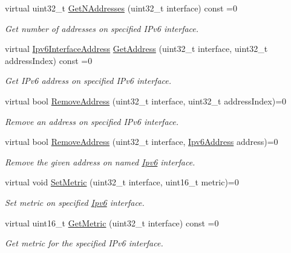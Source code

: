 \begin{DoxyCompactItemize}
virtual uint32\+\_\+t \hyperlink{classns3_1_1Ipv6_ac62012f48487d1e957a45f40a9386697}{Get\+N\+Addresses} (uint32\+\_\+t interface) const =0
\begin{DoxyCompactList}\small\item\em Get number of addresses on specified I\+Pv6 interface. \end{DoxyCompactList}\item 
virtual \hyperlink{classns3_1_1Ipv6InterfaceAddress}{Ipv6\+Interface\+Address} \hyperlink{classns3_1_1Ipv6_a00f1aa203323d9afa48d58af8af0e73b}{Get\+Address} (uint32\+\_\+t interface, uint32\+\_\+t address\+Index) const =0
\begin{DoxyCompactList}\small\item\em Get I\+Pv6 address on specified I\+Pv6 interface. \end{DoxyCompactList}\item 
virtual bool \hyperlink{classns3_1_1Ipv6_ad1e1c4d33ad96a76683ce8cea9d01780}{Remove\+Address} (uint32\+\_\+t interface, uint32\+\_\+t address\+Index)=0
\begin{DoxyCompactList}\small\item\em Remove an address on specified I\+Pv6 interface. \end{DoxyCompactList}\item 
virtual bool \hyperlink{classns3_1_1Ipv6_a29f451acbf047880073add4d0bd40550}{Remove\+Address} (uint32\+\_\+t interface, \hyperlink{classns3_1_1Ipv6Address}{Ipv6\+Address} address)=0
\begin{DoxyCompactList}\small\item\em Remove the given address on named \hyperlink{classns3_1_1Ipv6}{Ipv6} interface. \end{DoxyCompactList}\item 
virtual void \hyperlink{classns3_1_1Ipv6_ab8dfd51c931ebc11c107bff673bae827}{Set\+Metric} (uint32\+\_\+t interface, uint16\+\_\+t metric)=0
\begin{DoxyCompactList}\small\item\em Set metric on specified \hyperlink{classns3_1_1Ipv6}{Ipv6} interface. \end{DoxyCompactList}\item 
virtual uint16\+\_\+t \hyperlink{classns3_1_1Ipv6_a6bae4637f2a7f1e566a53c3270b891d4}{Get\+Metric} (uint32\+\_\+t interface) const =0
\begin{DoxyCompactList}\small\item\em Get metric for the specified I\+Pv6 interface. \end{DoxyCompactList}\item 

\end{DoxyCompactItemize}
